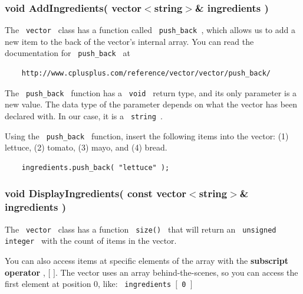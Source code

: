 \documentclass[a4paper,12pt]{book}
\begin{document}
                \hrulefill{}
                \subsubsection*{ void AddIngredients( vector$<$string$>$\& ingredients ) }

                    The \texttt{ vector } class has a function called
                    \texttt{ push\_back }, which allows us to add a
                    new item to the back of the vector's internal array.
                    You can read the documentation for \texttt{ push\_back } at
\begin{verbatim}
    http://www.cplusplus.com/reference/vector/vector/push_back/    
\end{verbatim}

                    The \texttt{ push\_back } function has a \texttt{ void }
                    return type, and its only parameter is a new value.
                    The data type of the parameter depends on what the
                    vector has been declared with. In our case, it is a
                    \texttt{ string }.

                    Using the \texttt{ push\_back } function, insert the
                    following items into the vector: (1) lettuce,
                    (2) tomato, (3) mayo, and (4) bread.

\begin{verbatim}
    ingredients.push_back( "lettuce" );
\end{verbatim}

                \hrulefill{}
                \subsubsection*{ void DisplayIngredients( const vector$<$string$>$\& ingredients ) }
                    The \texttt{ vector } class has a function \texttt{ size() }
                    that will return an \texttt{ unsigned integer } with
                    the count of items in the vector.

                    You can also access items at specific elements of the
                    array with the \textbf{ subscript operator },
                    $ [ $ $ ] $. The vector uses an array behind-the-scenes,
                    so you can access the first element at position 0, like:
                    \texttt{ ingredients $[$ 0 $]$ } ~\\
\end{document}
